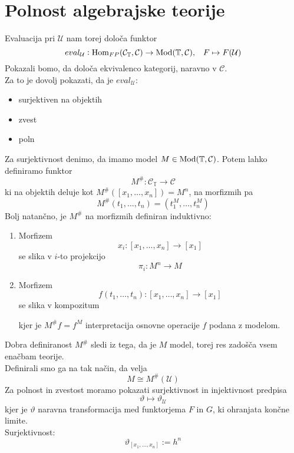 \documentclass[../kategoricna_logika.tex]{subfiles}
\begin{document}
\section{Polnost algebrajske teorije}
%
Evaluacija pri $\mathcal{U}$ nam torej določa funktor
$$eval_\mathcal{U} : \operatorname{Hom}_{FP}(\mathcal{C}_\mathbb{T}, \mathcal{C}) \to \operatorname{Mod}(\mathbb{T}, \mathcal{C}) \text{,} \quad F \mapsto F(\mathcal{U})$$
%
Pokazali bomo, da določa ekvivalenco kategorij, naravno v $\mathcal{C}$.\\
Za to je dovolj pokazati, da je $eval_\mathcal{U}$:
\begin{itemize}
\item surjektiven na objektih
\item zvest
\item poln
\end{itemize}
Za surjektivnost denimo, da imamo model
$M \in \operatorname{Mod}(\mathbb{T}, \mathcal{C})$. Potem lahko definiramo funktor
$$M^{\#} : \mathcal{C}_\mathbb{T} \to \mathcal{C}$$
ki na objektih deluje kot $M^{\#}([x_1, \ldots, x_n]) = M^n$, na
morfizmih pa
$$M^{\#}(t_1, \ldots, t_n) = (t_1^M, \ldots, t_n^M)$$
%
%
Bolj natančno, je $M^{\#}$ na morfizmih definiran induktivno:
\begin{enumerate}
\item Morfizem $$x_i : [x_1, \ldots, x_n] \to [x_1]$$ se slika v
  $i$-to projekcijo $$\pi_i : M^n \to M$$
\item Morfizem $$f(t_1, \ldots, t_n) : [x_1, \ldots, x_n] \to [x_1]$$
  se slika v kompozitum
  \begin{center}
  \end{center}
  kjer je $M^{\#}f = f^M$ interpretacija osnovne operacije $f$ podana
  z modelom.
\end{enumerate}
%
Dobra definiranost $M^{\#}$ sledi iz tega, da je $M$ model, torej res zadošča vsem enačbam teorije.\\
Definirali smo ga na tak način, da velja
$$M \cong M^{\#}(\mathcal{U})$$
%
Za polnost in zvestost moramo pokazati surjektivnost in injektivnost
predpisa $$\vartheta \mapsto \vartheta_\mathcal{U}$$
kjer je $\vartheta$ naravna transformacija med funktorjema $F$ in $G$, ki ohranjata končne limite.\\
Surjektivnost: $$\vartheta_{[x_1, \ldots, x_n]} := h^n$$\\
\end{document}
